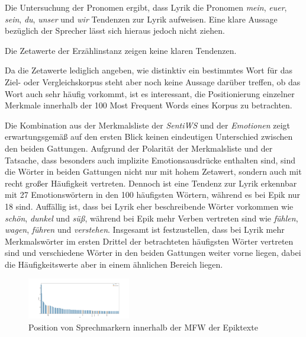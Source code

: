 \documentclass[a4paper,10p]{article}
\begin{document}
Die Untersuchung der Pronomen ergibt, dass Lyrik die Pronomen \textit{mein}, \textit{euer}, \textit{sein}, \textit{du}, \textit{unser} und \textit{wir} Tendenzen zur Lyrik aufweisen. Eine klare Aussage bezüglich der Sprecher lässt sich hieraus jedoch nicht ziehen. \par 

Die Zetawerte der Erzählinstanz zeigen keine klaren Tendenzen. \par

Da die Zetawerte lediglich angeben, wie distinktiv ein bestimmtes Wort für das Ziel- oder Vergleichskorpus steht aber noch keine Aussage darüber treffen, ob das Wort auch sehr häufig vorkommt, ist es interessant, die Positionierung einzelner Merkmale innerhalb der 100 Most Frequent Words eines Korpus zu betrachten.\par 

Die Kombination aus der Merkmalsliste der \textit{SentiWS} und der \textit{Emotionen} zeigt erwartungsgemäß auf den ersten Blick keinen eindeutigen Unterschied zwischen den beiden Gattungen. Aufgrund der Polarität der Merkmalsliste und der Tatsache, dass besonders auch implizite Emotionsausdrücke enthalten sind, sind die Wörter in beiden Gattungen nicht nur mit hohem Zetawert, sondern auch mit recht großer Häufigkeit vertreten. Dennoch ist eine Tendenz zur Lyrik erkennbar mit 27 Emotionswörtern in den 100 häufigsten Wörtern, während es bei Epik nur 18 sind. Auffällig ist, dass bei Lyrik eher beschreibende Wörter vorkommen wie \textit{schön}, \textit{dunkel} und \textit{süß}, während bei Epik mehr Verben vertreten sind wie \textit{fühlen}, \textit{wagen}, \textit{führen} und \textit{verstehen}. Insgesamt ist festzustellen, dass bei Lyrik mehr Merkmalswörter im ersten Drittel der betrachteten häufigsten Wörter vertreten sind und verschiedene Wörter in den beiden Gattungen weiter vorne liegen, dabei die Häufigkeitswerte aber in einem ähnlichen Bereich liegen. \par 

\begin{figure}
	\includegraphics[width=0.4\textwidth]{haupt_epik_sprechmarker_mfw.png}
	\caption{Position von Sprechmarkern innerhalb der MFW der Epiktexte}
	\label{fig:haupt_sprechmarker_in_mfw}
\end{figure}
\end{document}

